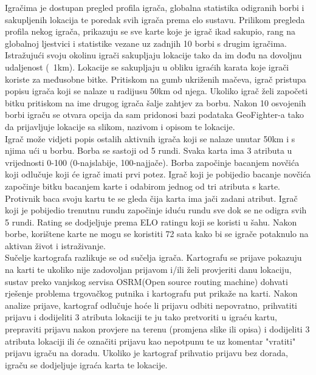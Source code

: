 	
		\textnormal{Igračima je dostupan pregled profila igrača, globalna statistika odigranih borbi i sakupljenih lokacija te poredak svih igrača prema elo sustavu. Prilikom pregleda profila nekog igrača, prikazuju se sve karte koje je igrač ikad sakupio, rang na globalnoj ljestvici i statistike vezane uz zadnjih 10 borbi s drugim igračima. Istražujući svoju okolinu igrači sakupljaju lokacije tako da im dođu na dovoljnu udaljenost (~1km). Lokacije se sakupljaju u obliku igraćih karata koje igrači koriste za međusobne bitke. Pritiskom na gumb ukriženih mačeva, igrač pristupa popisu igrača koji se nalaze u radijusu 50km od njega. Ukoliko igrač želi započeti bitku pritiskom na ime drugog igrača šalje zahtjev za borbu. Nakon 10 osvojenih borbi igraču se otvara opcija da sam pridonosi bazi podataka GeoFighter-a tako da prijavljuje lokacije sa slikom, nazivom i opisom te lokacije.}\\
	
		\textnormal{Igrač može vidjeti popis ostalih aktivnih igrača koji se nalaze unutar 50km i s njima ući u borbu. Borba se sastoji od 5 rundi. Svaka karta ima 3 atributa u vrijednosti 0-100 (0-najslabije, 100-najjače). Borba započinje bacanjem novčića koji odlučuje koji će igrač imati prvi potez. Igrač koji je pobijedio bacanje novčića započinje bitku bacanjem karte i odabirom jednog od tri atributa s karte. Protivnik baca svoju kartu te se gleda čija karta ima jači zadani atribut. Igrač koji je pobijedio trenutnu rundu započinje iduću rundu sve dok se ne odigra svih 5 rundi. Rating se dodjeljuje prema ELO ratingu koji se koristi u šahu.}
		\textnormal{Nakon borbe, korištene karte ne mogu se koristiti 72 sata kako bi se igrače potaknulo na aktivan život i istraživanje.}\\
		
		\textnormal{Sučelje kartografa razlikuje se od sučelja igrača. Kartografu se prijave pokazuju na karti te ukoliko nije zadovoljan prijavom i/ili želi provjeriti danu lokaciju, sustav preko vanjskog servisa OSRM(Open source routing machine) dohvati rješenje problema trgovačkog putnika i kartografu put prikaže na karti. Nakon analize prijave, kartograf odlučuje hoće li prijavu odbiti nepovratno, prihvatiti prijavu i dodijeliti 3 atributa lokaciji te ju tako pretvoriti u igraću kartu, prepraviti prijavu nakon provjere na terenu (promjena slike ili opisa) i dodijeliti 3 atributa lokaciji ili će označiti prijavu kao nepotpunu te uz komentar "vratiti" prijavu igraču na doradu. Ukoliko je kartograf prihvatio prijavu bez dorada, igraču se dodjeljuje igraća karta te lokacije.}\\
		
